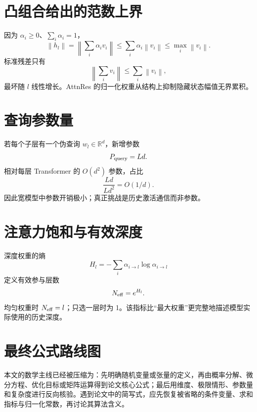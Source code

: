 \documentclass[UTF8,12pt,a4paper,fontset=none]{ctexart}
\numberwithin{equation}{section}
\newcommand{\R}{\mathbb{R}}
\newcommand{\norm}[1]{\left\lVert #1\right\rVert}
\begin{document}
\section{凸组合给出的范数上界}
因为 $\alpha_i\ge0$、$\sum_i\alpha_i=1$，
\begin{equation}
 \norm{h_l}
 =\norm{\sum_i\alpha_iv_i}
 \le\sum_i\alpha_i\norm{v_i}
 \le\max_i\norm{v_i}.
\end{equation}
标准残差只有
\begin{equation}
 \norm{\sum_iv_i}\le\sum_i\norm{v_i},
\end{equation}
最坏随 $l$ 线性增长。AttnRes 的归一化权重从结构上抑制隐藏状态幅值无界累积。

\section{查询参数量}
若每个子层有一个伪查询 $w_l\in\R^d$，新增参数
\begin{equation}
 P_{\rm query}=Ld.
\end{equation}
相对每层 Transformer 的 $O(d^2)$ 参数，占比
\begin{equation}
 \frac{Ld}{Ld^2}=O(1/d).
\end{equation}
因此宽模型中参数开销极小；真正挑战是历史激活通信而非参数。

\section{注意力饱和与有效深度}
深度权重的熵
\begin{equation}
 H_l=-\sum_i\alpha_{i\to l}\log\alpha_{i\to l}
\end{equation}
定义有效参与层数
\begin{equation}
 N_{\rm eff}=e^{H_l}.
\end{equation}
均匀权重时 $N_{\rm eff}=l$；只选一层时为 1。该指标比“最大权重”更完整地描述模型实际使用的历史深度。
\section{最终公式路线图}
\begin{keybox}[阅读完成后应掌握]
本文的数学主线已经被压缩为：先明确随机变量或张量的定义，再由概率分解、微分方程、优化目标或矩阵运算得到论文核心公式；最后用维度、极限情形、参数量和复杂度进行反向核验。遇到论文中的简写式，应先恢复被省略的条件变量、求和指标与归一化常数，再讨论其算法含义。
\end{keybox}
\clearpage
\end{document}
